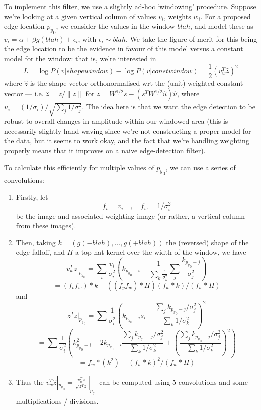 To implement this filter, we use a slightly ad-hoc `windowing' procedure.
Suppose we're looking at a given vertical column of values $v_i$, weights
$w_i$. For a proposed edge location ${p_y}_0$, we consider the values
in the window $blah$, and model these as $v_i = \alpha + \beta g(blah) + \epsilon_i$,
with $\epsilon_i \sim blah$. We take the figure of merit for this being
the edge location to be the evidence in favour of this model versus a constant
model for the window: that is, we're interested in
\[
L = \log P(v|shape window) - \log P(v|const window) = \frac{1}{2} (v_w^T \hat z)^2
\]
where $\hat z$ is the shape vector orthonormalised wrt the (unit)
weighted constant vector --- i.e. $\hat z = z / \| z \|$ for $z =
W^{1/2} s - (s^T W^{1/2} \hat u) \hat u$, where $\hat u_i = (1/\sigma_i)
/ \sqrt{\sum_j 1/\sigma_j^2}$. The idea here is that we want the edge
detection to be robust to overall changes in amplitude within our
windowed area (this is necessarily slightly hand-waving since we're not
constructing a proper model for the data, but it seems to work okay, and
the fact that we're handling weighting properly means that it improves
on a naive edge-detection filter).

To calculate this efficiently for multiple values of ${p_y}_0$, we can
use a series of convolutions:
\begin{enumerate}
\item Firstly, let
\[
f_v = v_i \quad , \quad f_w = 1/\sigma_i^2
\]
be the image and associated weighting image (or rather, a vertical
column from these images).
%
\item Then, taking $k = (g(-blah), \dots, g(+blah))$ the (reversed)
shape of the edge falloff, and $\Pi$ a top-hat kernel over the width of
the window, we have
\[
v_w^T z |_{{p_y}_0} 
= \sum_i \frac{v_i}{\sigma_i^2} \left(k_{{p_y}_0-i} - \frac{1}{\sum_k \frac{1}{\sigma_k^2}}
\sum_j \frac{k_{{p_y}_0-j}}{\sigma_j^2}\right)
\]
\[
= (f_v f_w) * k - ((f_y f_w) * \Pi)(f_w * k) / (f_w * \Pi)
\]
and
\[
z^T z |_{{p_y}_0}
= 
\sum \frac{1}{\sigma_i^2}\left(k_{{p_y}_0-i}s_i - \frac{\sum_j k_{{p_y}_0-j}/\sigma_j^2}
{\sum_k 1/\sigma_k^2}\right)^2
\]
\[
=
\sum \frac{1}{\sigma_i^2}\left(k_{{p_y}_0-i}^2 - 2 k_{{p_y}_0-i} \frac{\sum_j k_{{p_y}_0-j}/\sigma_j^2}
{\sum_k 1/\sigma_k^2} + \left(\frac{\sum_j k_{{p_y}_0-j}/\sigma_j^2}
{\sum_k 1/\sigma_k^2}\right)^2\right)
\]
\[
 = f_w * (k^2) - (f_w * k)^2 / (f_w * \Pi)
\]
%
\item Thus the $v_w^T \hat z |_{{p_y}_0} = \frac{v_w^T z}{\sqrt{z^T z}}|_{{p_y}_0}$
can be computed using 5 convolutions and some multiplications / divisions.
\end{enumerate}

